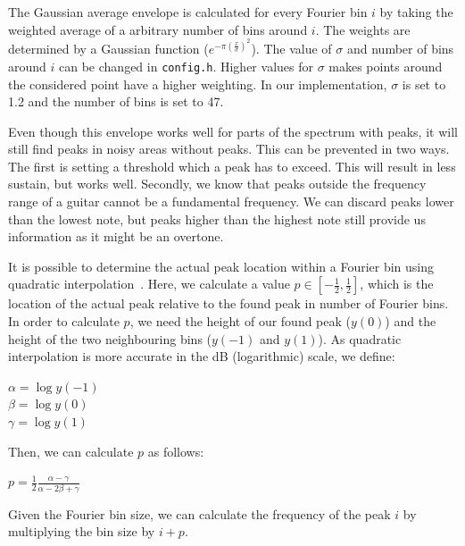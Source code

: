 \documentclass[10pt,twocolumn]{article}
\begin{document}
The Gaussian average envelope is calculated for every Fourier bin $i$ by taking the weighted average of a arbitrary number of bins around $i$. The weights are determined by a Gaussian function ($e^{-\pi(\frac{x}{\sigma})^2}$). The value of $\sigma$ and number of bins around $i$ can be changed in \texttt{config.h}. Higher values for $\sigma$ makes points around the considered point have a higher weighting. In our implementation, $\sigma$ is set to 1.2 and the number of bins is set to 47.

Even though this envelope works well for parts of the spectrum with peaks, it will still find peaks in noisy areas without peaks. This can be prevented in two ways. The first is setting a threshold which a peak has to exceed. This will result in less sustain, but works well. Secondly, we know that peaks outside the frequency range of a guitar cannot be a fundamental frequency. We can discard peaks lower than the lowest note, but peaks higher than the highest note still provide us information as it might be an overtone.

It is possible to determine the actual peak location within a Fourier bin using quadratic interpolation~\cite{interpol2}. Here, we calculate a value $p \in [-\frac{1}{2}, \frac{1}{2}]$, which is the location of the actual peak relative to the found peak in number of Fourier bins. In order to calculate $p$, we need the height of our found peak ($y(0)$) and the height of the two neighbouring bins ($y(-1)$ and $y(1)$). As quadratic interpolation is more accurate in the dB (logarithmic) scale, we define:
\begin{center}\vspace{-1mm}
    $\alpha = \log y(-1)$\\
    $\beta = \log y(0)$\\
    $\gamma = \log y(1)$
\end{center}\vspace{-1mm}
Then, we can calculate $p$ as follows:
\begin{center}\vspace{-1mm}
    $p = \frac{1}{2} \frac{\alpha - \gamma}{\alpha - 2\beta + \gamma}$
\end{center}\vspace{-1mm}
Given the Fourier bin size, we can calculate the frequency of the peak $i$ by multiplying the bin size by $i + p$.
\end{document}
